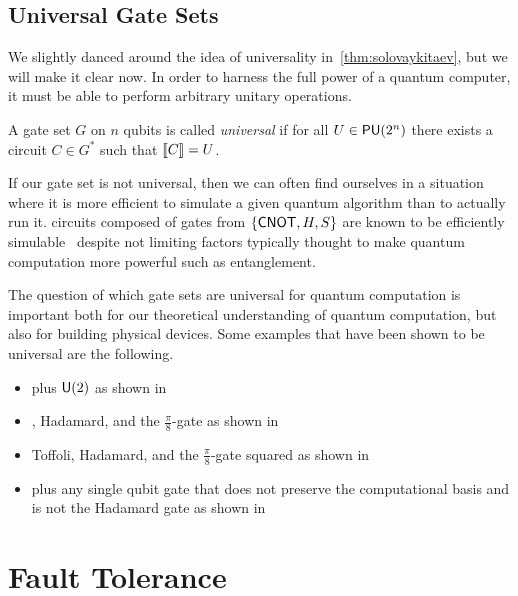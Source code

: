 \subsection{Universal Gate Sets}\label{sec:universal}

We slightly danced around the idea of universality in~\cref{thm:solovaykitaev}, but we will make it clear now.
In order to harness the full power of a quantum computer, it must be able to perform arbitrary unitary operations.
\begin{definition}
    A gate set $G$ on $n$ qubits is called \emph{universal} if for all $U \in \mathsf{PU} (2^n)$ there exists a circuit $C\in G^*$ such that $\llbracket C\rrbracket = U$.
\end{definition}
If our gate set is not universal, then we can often find ourselves in a situation where it is more efficient to simulate a given quantum algorithm than to actually run it.
\Eg{} circuits composed of gates from $\qty{\ensuremath{\mathsf{CNOT}}, H, S}$ are known to be efficiently simulable~\cite{gottesman-knill} despite not limiting factors typically thought to make quantum computation more powerful such as entanglement.

The question of which gate sets are universal for quantum computation is important both for our theoretical understanding of quantum computation, but also for building physical devices.
Some examples that have been shown to be universal are the following.
\begin{itemize}
    \item \CNOT{} plus $\mathsf{U} (2)$ as shown in~\cite{universal-cnot-u2}
    \item \CNOT{}, Hadamard, and the $\frac{\pi}{8}$-gate as shown in~\cite{universal-cnot-had-p8}
    \item Toffoli, Hadamard, and the $\frac{\pi}{8}$-gate squared as shown in~\cite{bigkitaev}
    \item \CNOT{} plus any single qubit gate that does not preserve the computational basis and is not the Hadamard gate as shown in~\cite{universal-cnot-basis-change}
\end{itemize}

\section{Fault Tolerance}\label{sec:ft}

